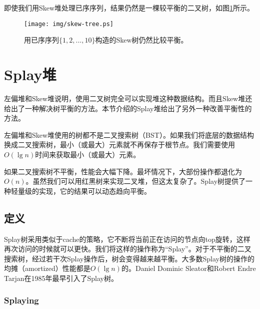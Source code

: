 \documentclass[UTF8]{article}
\begin{document}
即使我们用Skew堆处理已序序列，结果仍然是一棵较平衡的二叉树，如图\ref{fig:skew-tree}所示。

\begin{figure}[htbp]
   \begin{center}
   	  \texttt{[image: img/skew-tree.ps]}
    \caption{用已序序列$\{1, 2, ..., 10\}$构造的Skew树仍然比较平衡。}
    \label{fig:skew-tree}
   \end{center}
\end{figure}



\section{Splay堆}
\label{splayheap}

左偏堆和Skew堆说明，使用二叉树完全可以实现堆这种数据结构。而且Skew堆还给出了一种解决树平衡的方法。本节介绍的Splay堆给出了另外一种改善平衡性的方法。

左偏堆和Skew堆使用的树都不是二叉搜索树（BST）。如果我们将底层的数据结构换成二叉搜索树，最小（或最大）元素就不再保存于根节点。我们需要使用$O(\lg n)$时间来获取最小（或最大）元素。

如果二叉搜索树不平衡，性能会大幅下降。最坏情况下，大部份操作都退化为$O(n)$。虽然我们可以用红黑树来实现二叉堆，但这太复杂了。Splay树提供了一种轻量级的实现，它的结果可以动态趋向平衡。


\subsection{定义}

Splay树采用类似于cache的策略，它不断将当前正在访问的节点向top旋转，这样再次访问的时候就可以更快。我们将这样的操作称为“Splay”。对于不平衡的二叉搜索树，经过若干次Splay操作后，树会变得越来越平衡。大多数Splay树的操作的均摊（amortized）性能都是$O(\lg n)$的。Daniel Dominic Sleator和Robert Endre Tarjan在1985年最早引入了Splay树\cite{wiki-splay-tree}\cite{self-adjusting-trees}。

\subsubsection{Splaying}
\end{document}
